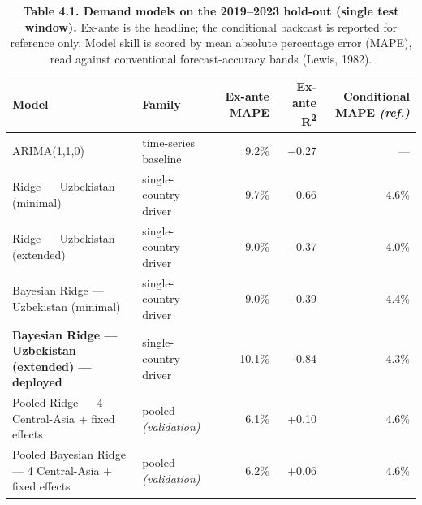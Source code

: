 \documentclass[10pt,twocolumn]{article}
\begin{document}
\begin{table}[tp]
\centering
\caption*{\textbf{Table 4.1. Demand models on the 2019--2023 hold-out (single test window).} Ex-ante is the headline; the conditional backcast is reported for reference only. Model skill is scored by mean absolute percentage error (MAPE), read against conventional forecast-accuracy bands (Lewis, 1982).}
\renewcommand{\arraystretch}{1.18}\small
\begin{tabularx}{\textwidth}{LLrrr}
\toprule
\textbf{Model} & \textbf{Family} & \textbf{Ex-ante MAPE} & \textbf{Ex-ante R\textsuperscript{2}} & \textbf{Conditional MAPE \textit{(ref.)}} \\
\midrule
ARIMA(1,1,0) & time-series baseline & 9.2\% & $-$0.27 & --- \\
Ridge --- Uzbekistan (minimal) & single-country driver & 9.7\% & $-$0.66 & 4.6\% \\
Ridge --- Uzbekistan (extended) & single-country driver & 9.0\% & $-$0.37 & 4.0\% \\
Bayesian Ridge --- Uzbekistan (minimal) & single-country driver & 9.0\% & $-$0.39 & 4.4\% \\
\textbf{Bayesian Ridge --- Uzbekistan (extended) --- deployed} & single-country driver & 10.1\% & $-$0.84 & 4.3\% \\
Pooled Ridge --- 4 Central-Asia + fixed effects & pooled \textit{(validation)} & 6.1\% & +0.10 & 4.6\% \\
Pooled Bayesian Ridge --- 4 Central-Asia + fixed effects & pooled \textit{(validation)} & 6.2\% & +0.06 & 4.6\% \\
\bottomrule
\end{tabularx}
\par{}
\end{table}
\end{document}
